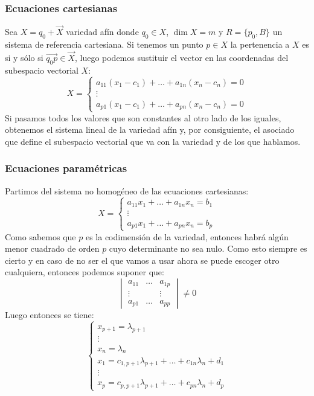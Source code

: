 \documentclass[10pt,a4paper,openright]{book}
\theoremstyle{break}
\begin{document}
\subsubsection*{Ecuaciones cartesianas}
Sea $X= q_0 + \vec{X}$ variedad afín donde $q_0 \in X$, $\dim X =m$ y $R= \{p_0, B\}$ un sistema de referencia cartesiana. Si tenemos un punto $p \in X$ la pertenencia a $X$ es si y sólo si $\vec{q_0 p} \in \vec{X}$, luego podemos sustituir el vector en las coordenadas del subespacio vectorial $X$:
$$X =\begin{cases} a_{11} (x_1 - c_1) + \ldots + a_{1n} (x_n - c_n) = 0 \\ \vdots \\  a_{p1} (x_1 - c_1) + \ldots + a_{pn} (x_n - c_n) = 0 \end{cases}$$
Si pasamos todos los valores que son constantes al otro lado de los iguales, obtenemos el sistema lineal de la variedad afín y, por consiguiente, el asociado que define el subespacio vectorial que va con la variedad y de los que hablamos.

\subsubsection*{Ecuaciones paramétricas}
Partimos del sistema no homogéneo de las ecuaciones cartesianas:
$$X = \begin{cases} a_{11}x_1 + \ldots +  a_{1n}x_n = b_1 \\ \vdots \\  a_{p1}x_1 + \ldots + a_{pn}x_n = b_p \end{cases}$$
Como sabemos que $p$ es la codimensión de la variedad, entonces habrá algún menor cuadrado de orden $p$ cuyo determinante no sea nulo. Como esto siempre es cierto y en caso de no ser el que vamos a usar ahora se puede escoger otro cualquiera, entonces podemos suponer que:
$$\begin{vmatrix} a_{11} & \ldots & a_{1p} \\ \vdots & & \vdots \\ a_{p1} & \ldots & a_{pp} \end{vmatrix} \neq 0 $$
Luego entonces se tiene:
$$\begin{cases} x_{p+1} = \lambda_{p+1} \\ \vdots \\ x_n = \lambda_n \\ x_1 = c_{1, p+1} \lambda_{p+1} + \ldots + c_{1n} \lambda_n + d_1 \\ \vdots \\ x_p = c_{p,p+1} \lambda_{p+1} + \ldots + c_{pn} \lambda_n + d_p \end{cases}$$
\end{document}
